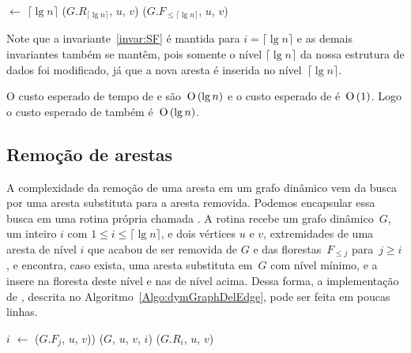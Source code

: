 \begin{algorithm}
\caption{\dymGraphAddEdge($G$, $u$, $v$)}
\label{Algo:dymGraphAddEdge}
\begin{algorithmic}[1]
\State \nivel[$u$,$v$] $\gets$ $\lceil \lg n \rceil$
\State \graphAdd($G$.$R_{\lceil \lg n \rceil}$, $u$, $v$)
\Else 
\State \dymForestAddEdge($G.F_{\leqslant\lceil \lg n \rceil}$, $u$, $v$)
\EndIf
\end{algorithmic}
\end{algorithm}

Note que a invariante~\ref{invar:SF} é mantida para $i = \lceil \lg n \rceil$ e as demais invariantes também se mantêm, pois somente o nível $\lceil \lg n \rceil$ da nossa estrutura de dados foi modificado, já que a nova aresta é inserida no nível~$\lceil \lg n \rceil$. 

O custo esperado de tempo de \dymForestQuery{} e \dymGraphAddEdge{} são~$\text{O}\left(\lg n\right)$ e o custo esperado de \graphAdd{} é~$\text{O}\left(1\right)$. Logo o custo esperado de \dymGraphAddEdge{} também é~$\text{O}\left(\lg n\right)$.

\subsection{Remoção de arestas}

\newcommand{\ceil}[1]{\lceil{#1}\rceil}

A complexidade da remoção de uma aresta em um grafo dinâmico vem da busca por uma aresta substituta para a aresta removida. Podemos encapsular essa busca em uma rotina própria chamada \dymGraphReplace{}. A rotina \dymGraphReplace{} recebe um grafo dinâmico~$G$, um inteiro $i$ com $1 \leq i \leq \ceil{\lg n}$, e dois vértices $u$ e $v$, extremidades de uma aresta de nível $i$ que acabou de ser removida de $G$ e das florestas~$F_{\leqslant j}$ para~$j \geq i$, e encontra, caso exista, uma aresta substituta em~$G$ com nível mínimo, e a insere na floresta deste nível e nas de nível acima. Dessa forma, a implementação de \dymGraphDelEdge{}, descrita no Algoritmo~\ref{Algo:dymGraphDelEdge}, pode ser feita em poucas linhas.

\begin{algorithm}
\caption{\dymGraphDelEdge($G$, $u$, $v$)}
\label{Algo:dymGraphDelEdge}
\begin{algorithmic}[1]
\State $i$ $\gets$ \nivel[$u,v$]
\label{Algo:dymGraphDelEdge:linha:if}
\label{linha2}
\State \dymForestDelEdge($G$.$F_j$, $u$, $v$))
\EndFor
\State \dymGraphReplace($G$, $u$, $v$, $i$)
\Else
  \State \graphDel($G$.$R_i$, $u$, $v$)\label{Algo:dymGraphDelEdge:linha:removeLA}
\EndIf
\end{algorithmic}
\end{algorithm}

